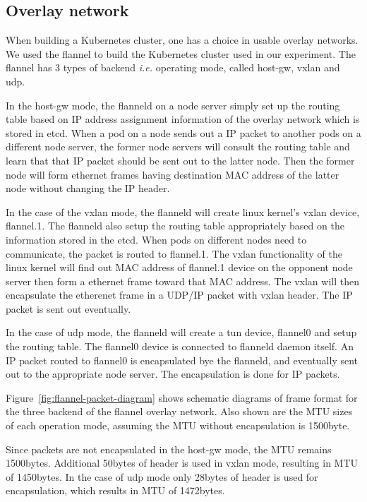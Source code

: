 \subsection{Overlay network}

When building a Kubernetes cluster, one has a choice in usable overlay networks.
We used the flannel to build the Kubernetes cluster used in our experiment. 
The flannel has 3 types of backend {\it i.e.} operating mode, called host-gw, vxlan and udp\cite{CoreOSFlannelBackend}.

In the host-gw mode, the flanneld on a node server simply set up the routing table 
based on IP address assignment information of the overlay network which is stored in etcd. 
When a pod on a node sends out a IP packet to another pods on a different node server, 
the former node servers will consult the routing table and learn that that IP packet should be sent out to the latter node.
Then the former node will form ethernet frames having destination MAC address of the latter node without changing the IP header.

In the case of the vxlan mode, the flanneld will create linux kernel's vxlan device, flannel.1. 
The flanneld also setup the routing table appropriately based on the information stored in the etcd.
When pods on different nodes need to communicate, the packet is routed to flannel.1.
The vxlan functionality of the linux kernel will find out MAC address of flannel.1 device on the opponent node server 
then form a ethernet frame toward that MAC address.
The vxlan will then encapsulate the etherenet frame in a UDP/IP packet with vxlan header.
The IP packet is sent out eventually.

In the case of udp mode, the flanneld will create a tun device, flannel0 and setup the routing table.
The flannel0 device is connected to flanneld daemon itself.
An IP packet routed to flannel0 is encapsulated bye the flanneld, and eventually sent out 
to the appropriate node server. 
The encapsulation is done for IP packets.

Figure~\ref{fig:flannel-packet-diagram} shows schematic diagrams of frame format for the three backend of 
the flannel overlay network.
Also shown are the MTU sizes of each operation mode, assuming the MTU without encapsulation is 1500byte.

Since packets are not encapsulated in the host-gw mode, the MTU remains 1500bytes.
Additional 50bytes of header is used in vxlan mode, resulting in MTU of 1450bytes.
In the case of udp mode only 28bytes of header is used for encapsulation, which results in MTU of 1472bytes.


